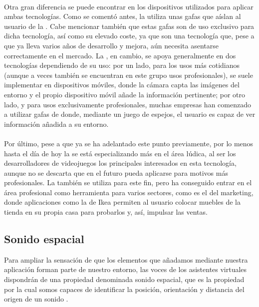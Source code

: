 \documentclass{subfiles}
\begin{document}
        \paragraph{}
        Otra gran diferencia se puede encontrar en los dispositivos utilizados para aplicar ambas tecnologías. Como se comentó antes, la \rv utiliza unas gafas que aíslan al usuario de la \realidad. Cabe mencionar también que estas gafas son de uso exclusivo para dicha tecnología, así como su elevado coste, ya que son una tecnología que, pese a que ya lleva varios años de desarrollo y mejora, aún necesita asentarse correctamente en el mercado. La \ra, en cambio, se apoya generalmente en dos tecnologías dependiendo de su uso: por un lado, para los usos más cotidianos (aunque a veces también se encuentran en este grupo usos profesionales), se suele implementar en dispositivos móviles, donde la cámara capta las imágenes del entorno y el propio dispositivo móvil añade la información pertinente; por otro lado, y para usos exclusivamente profesionales, muchas empresas han comenzado a utilizar gafas de \ra donde, mediante un juego de espejos, el usuario es capaz de ver información añadida a su entorno.

        \paragraph{}
        Por último, pese a que ya se ha adelantado este punto previamente, por lo menos hasta el día de hoy la \rv se está especializando más en el área lúdica, al ser los desarrolladores de videojuegos los principales interesados en esta tecnología, aunque no se descarta que en el futuro pueda aplicarse para motivos más profesionales. La \ra también se utiliza para este fin, pero ha conseguido entrar en el área profesional como herramienta para varios sectores, como es el del marketing, donde aplicaciones como la de Ikea \cite{web:ikea_placeapp} permiten al usuario colocar muebles de la tienda en su propia casa para probarlos y, así, impulsar las ventas.

        \subsection{Sonido espacial}
        \label{sec:introduccion_sonido_espacial}
        Para ampliar la sensación de que los elementos que añadamos mediante nuestra aplicación forman parte de nuestro entorno, las voces de los asistentes virtuales dispondrán de una propiedad denominada sonido espacial, que es la propiedad por la cual somos capaces de identificar la posición, orientación y distancia del origen de un sonido \cite{web:wikipedia_localizacion_sonido}.
\end{document}
